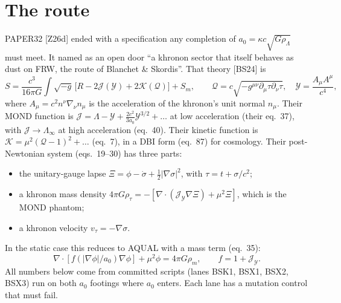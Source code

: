 \documentclass[10pt]{article}
\begin{document}
\section{The route}
PAPER32 [Z26d] ended with a specification any completion of $a_0=\kappa c\sqrt{G\rho_\Lambda}$ must meet. It named as an open door ``a khronon sector that itself behaves as dust on FRW, the route of Blanchet \& Skordis''. That theory [BS24] is
\begin{equation}
S=\frac{c^3}{16\pi G}\int\!\sqrt{-g}\,\big[R-2\mathcal J(\mathcal Y)+2\mathcal K(\mathcal Q)\big]+S_m,\qquad \mathcal Q=c\sqrt{-g^{\mu\nu}\partial_\mu\tau\partial_\nu\tau},\quad \mathcal Y=\frac{A_\mu A^\mu}{c^4},
\end{equation}
where $A_\mu=c^2n^\nu\nabla_\nu n_\mu$ is the acceleration of the khronon's unit normal $n_\mu$.
Their MOND function is $\mathcal J=\Lambda-\mathcal Y+\frac{2c^2}{3a_0}\mathcal Y^{3/2}+\dots$ at low acceleration (their eq.~37), with $\mathcal J\to\Lambda_\infty$ at high acceleration (eq.~40). Their kinetic function is $\mathcal K=\mu^2(\mathcal Q-1)^2+\dots$ (eq.~7), in a DBI form (eq.~87) for cosmology.
Their post-Newtonian system (eqs.~19--30) has three parts:
\begin{itemize}
\item the unitary-gauge lapse $\Xi=\phi-\dot\sigma+\tfrac12|\nabla\sigma|^2$, with $\tau=t+\sigma/c^2$;
\item a khronon mass density $4\pi G\rho_\tau=-[\nabla\!\cdot(\mathcal J_{\mathcal Y}\nabla\Xi)+\mu^2\Xi]$, which is the MOND phantom;
\item a khronon velocity $v_\tau=-\nabla\sigma$.
\end{itemize}
In the static case this reduces to AQUAL with a mass term (eq.~35):
\begin{equation}
\nabla\!\cdot[f(|\nabla\phi|/a_0)\nabla\phi]+\mu^2\phi=4\pi G\rho_m,\qquad f=1+\mathcal J_{\mathcal Y}.
\end{equation}
All numbers below come from committed scripts (lanes BSK1, BSX1, BSX2, BSX3) run on both $a_0$ footings where $a_0$ enters. Each lane has a mutation control that must fail.
\end{document}
